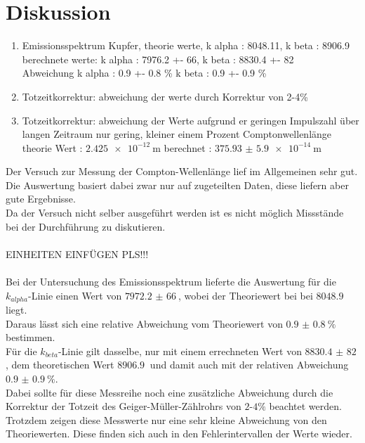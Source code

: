\newpage
\section{Diskussion}
    \begin{enumerate}
        \item Emissionsspektrum Kupfer, theorie werte,      k alpha : 8048.11,      k beta : 8906.9\\
                                        berechnete werte:   k alpha : 7976.2 +- 66, k beta : 8830.4 +- 82\\
                                        Abweichung          k alpha : 0.9 +- 0.8 \% k beta : 0.9 +- 0.9 \%
        \item Totzeitkorrektur: abweichung der werte durch Korrektur von 2-4\% 

        \item Totzeitkorrektur: abweichung der Werte aufgrund er geringen Impulszahl über langen Zeitraum nur gering, kleiner einem Prozent
                Comptonwellenlänge theorie Wert : $\SI{2.425e-12}{\meter}$ berechnet : $\SI{375.93(590)e-14}{\meter}$

        

    \end{enumerate}


\noindent
Der Versuch zur Messung der Compton-Wellenlänge lief im Allgemeinen sehr gut. Die Auswertung basiert dabei zwar nur auf zugeteilten Daten, diese liefern aber gute Ergebnisse.\\
Da der Versuch nicht selber ausgeführt werden ist es nicht möglich Missstände bei der Durchführung zu diskutieren.\\\\
\noindent
EINHEITEN EINFÜGEN PLS!!!\\\\
Bei der Untersuchung des Emissionsspektrum lieferte die Auswertung für die $k_{alpha}$-Linie einen Wert von $\SI{7972.2(660)}{}$, wobei der Theoriewert\cite{theo} bei bei $\SI{8048.9}{}$ liegt.\\
Daraus lässt sich eine relative Abweichung vom Theoriewert von $\SI{0.9(08)}{\percent}$ bestimmen.\\
Für die $k_{beta}$-Linie gilt dasselbe, nur mit einem errechneten Wert von $\SI{8830.4(820)}{}$, dem theoretischen Wert $\SI{8906.9}{}$\cite{theo} und damit auch mit der relativen Abweichung $\SI{0.9(09)}{\percent}$.\\
Dabei sollte für diese Messreihe noch eine zusätzliche Abweichung durch die Korrektur der Totzeit des Geiger-Müller-Zählrohrs von $2$-$4\si{\percent}$ beachtet werden.\\
Trotzdem zeigen diese Messwerte nur eine sehr kleine Abweichung von den Theoriewerten. Diese finden sich auch in den Fehlerintervallen der Werte wieder.\\\\

